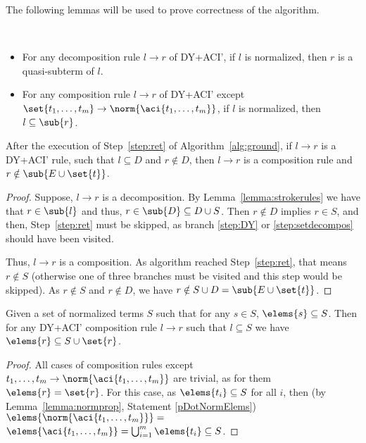 The following lemmas will be used to prove correctness of the algorithm. 

\begin{lemma}\label{lemma:strokerules} \
\begin{itemize}
	\item For any decomposition rule $l\rightarrow r$ of DY+ACI', if  $l$ is normalized, then $r$ is a quasi-subterm of $l$.
	\item For any composition rule $l\rightarrow r$ of DY+ACI' except $\set{t_1, \dots, t_m} \rightarrow \norm{\aci{t_1, \dots, t_m}}$, if $l$ is normalized, then $l\subseteq \sub{r}$.
\end{itemize}
\end{lemma}




\begin{lemma}\label{lemma:walkout}
	After the execution of Step~\ref{step:ret} of Algorithm~\ref{alg:ground}, if $l\rightarrow r$ is a DY+ACI' rule, such that $l\subseteq D$ and $r\notin D$, then $l\rightarrow r$ is a composition rule and $r\notin \sub{E\cup\set{t}}$.
\begin{proof}
	Suppose, $l\rightarrow r$ is a decomposition.   By Lemma~\ref{lemma:strokerules} we have that $r\in\sub{l}$ and thus, $r\in\sub{D}\subseteq D \cup S$. Then  $r\notin D$ implies $r\in S$, and then, Step~\ref{step:ret} must be skipped, as branch \ref{step:DY} or \ref{step:setdecompos} should have been visited. 

	Thus, $l\rightarrow r$ is  a composition.
	 As algorithm reached  Step~\ref{step:ret}, that means $r\notin S$ (otherwise one of three branches must be visited and this step would be skipped). As $r\notin S$ and $r\notin D$, we have $r\notin S\cup D = \sub{E\cup\set{t}}$.
\end{proof}

\end{lemma}

\begin{lemma}\label{lemma:composelems}
	Given a set of normalized terms $S$ such that for any $s\in S$, $\elems{s}\subseteq S$.
	Then for any DY+ACI' composition rule $l\rightarrow r$ such that $l\subseteq S$ we have $\elems{r}\subseteq S\cup\set{r}$.
\begin{proof}
	All cases of composition rules except $ {t_1, \dots, t_m} \rightarrow \norm{\aci{t_1, \dots, t_m}}$ are trivial, as for them $\elems{r}=\set{r}$.
	For this case, as $\elems{t_i}\subseteq S$ for all $i$, then (by Lemma~\ref{lemma:normprop}, Statement \ref{pDotNormElems}) $\elems{\norm{\aci{t_1, \dots, t_m}}} =  $ \\ $ \elems{\aci{t_1, \dots, t_m}} =\bigcup_{i=1}^m\elems{t_i}\subseteq S$.
\end{proof}

\end{lemma}


